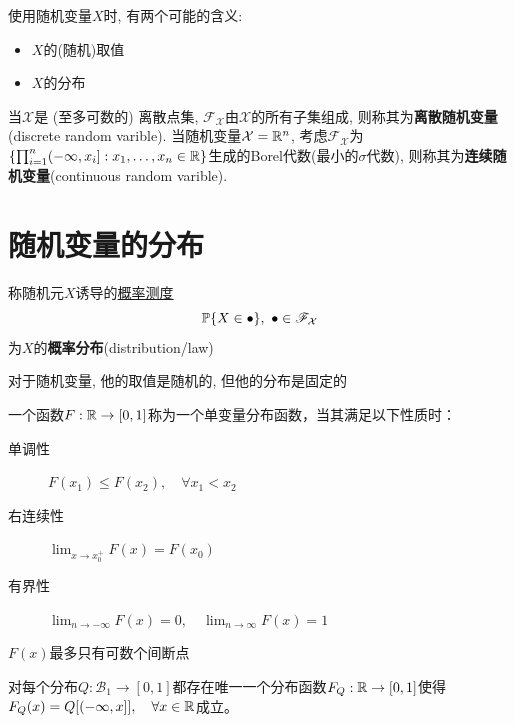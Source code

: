 \begin{remark}
    使用随机变量$X$时, 有两个可能的含义:
    \begin{itemize}
        \item $X$的(随机)取值
        \item $X$的分布
    \end{itemize}
\end{remark}

\begin{definition}[离散与连续随机变量]
    当$\mathcal{X}$是 (至多可数的) 离散点集, $\mathscr{F}_{\mathcal{X}}$由$\mathcal{X}$的所有子集组成, 则称其为\textbf{离散随机变量}(discrete random varible). 当随机变量$\mathcal{X} = \mathbb{R}^{n}$, 考虑$\mathscr{F}_{\mathcal{X}}$为$\left\{\prod_{i=1}^{n}(-\infty,x_{i}] : x_{1},\dots,x_{n}\in\mathbb{R}\right\}$生成的Borel代数(最小的$\sigma$代数), 则称其为\textbf{连续随机变量}(continuous random varible).
\end{definition}

\section{随机变量的分布}

\begin{definition}
    称随机元$X$诱导的\underline{概率测度}
    \[ \P\{X\in\bullet\},\ \bullet\in\mathscr{F}_{\mathcal{X}} \]
    为$X$的\textbf{概率分布}(distribution/law)
\end{definition}
\begin{remark}
    对于随机变量, 他的取值是随机的, 但他的分布是固定的
\end{remark}

\begin{definition}[单变量分布函数]
    一个函数$F : \mathbb{R} \to [0,1]$称为一个单变量分布函数，当其满足以下性质时：
    \begin{description}
        \item[单调性] $F(x_1)\le F(x_2) , \quad \forall x_1<x_2$
        \item[右连续性] $\lim_{x \to x_0^+}F(x)=F(x_0)$
        \item[有界性] $\lim_{n \to -\infty}F(x)=0, \quad \lim_{n \to \infty}F(x)=1$
    \end{description}
\end{definition}

\begin{property}
    $F(x)$最多只有可数个间断点
\end{property}

\begin{proposition}
    对每个分布$Q: \mathscr{B}_1 \to [0,1]$都存在唯一一个分布函数$F_Q : \mathbb{R} \to [0,1]$使得$F_Q(x)=Q[(-\infty,x]], \quad \forall x \in \mathbb{R}$成立。
\end{proposition}

